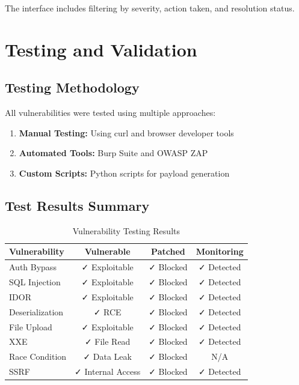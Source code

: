 \documentclass[12pt,a4paper]{article}
\begin{document}
The interface includes filtering by severity, action taken, and resolution status.

\newpage

\section{Testing and Validation}

\subsection{Testing Methodology}

All vulnerabilities were tested using multiple approaches:
\begin{enumerate}[leftmargin=*]
    \item \textbf{Manual Testing:} Using curl and browser developer tools
    \item \textbf{Automated Tools:} Burp Suite and OWASP ZAP
    \item \textbf{Custom Scripts:} Python scripts for payload generation
\end{enumerate}

\subsection{Test Results Summary}

\begin{table}[h]
\centering
\begin{tabular}{|l|c|c|c|}
\hline
\textbf{Vulnerability} & \textbf{Vulnerable} & \textbf{Patched} & \textbf{Monitoring} \\
\hline
Auth Bypass & ✓ Exploitable & ✓ Blocked & ✓ Detected \\
\hline
SQL Injection & ✓ Exploitable & ✓ Blocked & ✓ Detected \\
\hline
IDOR & ✓ Exploitable & ✓ Blocked & ✓ Detected \\
\hline
Deserialization & ✓ RCE & ✓ Blocked & ✓ Detected \\
\hline
File Upload & ✓ Exploitable & ✓ Blocked & ✓ Detected \\
\hline
XXE & ✓ File Read & ✓ Blocked & ✓ Detected \\
\hline
Race Condition & ✓ Data Leak & ✓ Blocked & N/A \\
\hline
SSRF & ✓ Internal Access & ✓ Blocked & ✓ Detected \\
\hline
\end{tabular}
\caption{Vulnerability Testing Results}
\end{table}
\end{document}
